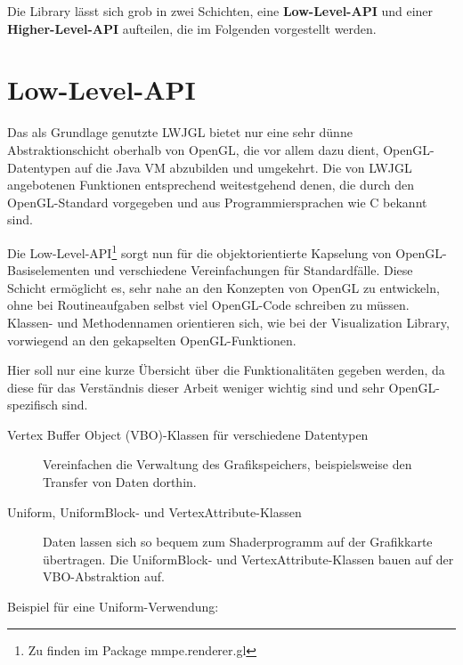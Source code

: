 \documentclass[a4paper,10pt]{sphinxmanual}
\begin{document}
Die Library lässt sich grob in zwei Schichten, eine \textbf{Low-Level-API} und einer \textbf{Higher-Level-API} aufteilen, die im Folgenden vorgestellt werden.


\section{Low-Level-API}
\label{renderbib:low-level-api}
Das als Grundlage genutzte LWJGL bietet nur eine sehr dünne Abstraktionschicht oberhalb von OpenGL, die vor allem dazu dient, OpenGL-Datentypen auf die Java VM abzubilden und umgekehrt.
Die von LWJGL angebotenen Funktionen entsprechend weitestgehend denen, die durch den OpenGL-Standard vorgegeben und aus Programmiersprachen wie C bekannt sind.

Die Low-Level-API\footnote{
Zu finden im Package mmpe.renderer.gl
} sorgt nun für die objektorientierte Kapselung von OpenGL-Basiselementen und verschiedene Vereinfachungen für Standardfälle.
Diese Schicht ermöglicht es, sehr nahe an den Konzepten von OpenGL zu entwickeln, ohne bei Routineaufgaben selbst viel OpenGL-Code schreiben zu müssen.
Klassen- und Methodennamen orientieren sich, wie bei der Visualization Library, vorwiegend an den gekapselten OpenGL-Funktionen.

Hier soll nur eine kurze Übersicht über die Funktionalitäten gegeben werden, da diese für das Verständnis dieser Arbeit weniger wichtig sind und sehr OpenGL-spezifisch sind.
\begin{description}
\item[{Vertex Buffer Object (VBO)-Klassen für verschiedene Datentypen}] \leavevmode
Vereinfachen die Verwaltung des Grafikspeichers, beispielsweise den Transfer von Daten dorthin.

\item[{Uniform, UniformBlock- und VertexAttribute-Klassen}] \leavevmode
Daten lassen sich so bequem zum Shaderprogramm auf der Grafikkarte übertragen. Die UniformBlock- und VertexAttribute-Klassen bauen auf der VBO-Abstraktion auf.

\end{description}

Beispiel für eine Uniform-Verwendung:
\end{document}
